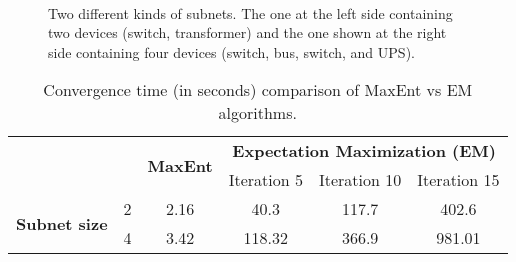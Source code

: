 \begin{table}[!p]
\end{table}

\begin{figure}[!p]
\centering \vspace{2cm}
	\subfloat{\texttt{[image: s1]}}\\ \vspace{1cm}
	\subfloat{\texttt{[image: s2]}}
	\vspace{0.5cm}
\caption{Two different kinds of subnets. The one at the left side containing two devices (switch, transformer) and the one shown at the right side containing four devices (switch, bus, switch, and UPS).} \label{fig:twosubnets} \vspace{2cm}
\end{figure}

\begin{table}[!p]
\vspace{2cm}
\renewcommand{\tabcolsep}{0.2 cm}
\renewcommand*{\arraystretch}{2}
\centering \caption{Convergence time (in seconds) comparison of MaxEnt vs EM algorithms.}
\begin{tabular}{|c|c|c|c|c|c|}
 \hline \multicolumn{2}{|c|}{\multirow{2}{*}{}} & \multirow{2}{*}{\textbf{MaxEnt}} & \multicolumn{3}{c|}{\textbf{Expectation Maximization (EM)}}\\
\cline{4-6}
\multicolumn{2}{|c|}{} & & Iteration 5 & Iteration 10 & Iteration 15\\
\hline
\multirow{2}{*}{\textbf{Subnet size}} & 2 & 2.16 & 40.3 & 117.7 & 402.6\\
\cline{2-6}
& 4 & 3.42 & 118.32 & 366.9 & 981.01\\
\hline
\end{tabular}
\label{tbl:eval_t}
\end{table}


